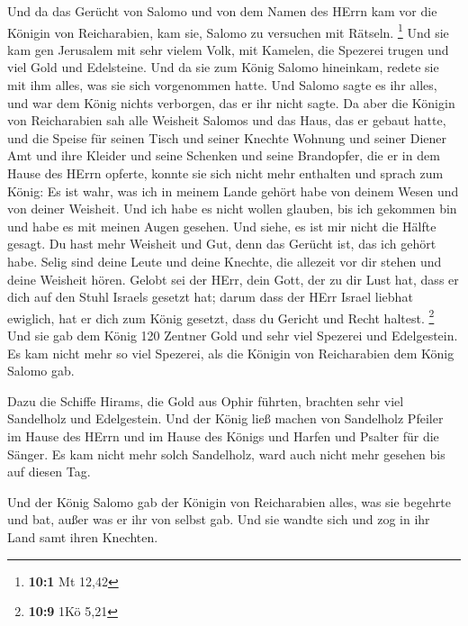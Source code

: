  Und da das Gerücht von Salomo und von dem Namen des HErrn
kam vor die Königin von Reicharabien, kam sie, Salomo zu versuchen mit
Rätseln. \footnote{\textbf{10:1} Mt 12,42}  Und sie kam gen
Jerusalem mit sehr vielem Volk, mit Kamelen, die Spezerei trugen und
viel Gold und Edelsteine. Und da sie zum König Salomo hineinkam, redete
sie mit ihm alles, was sie sich vorgenommen hatte.  Und
Salomo sagte es ihr alles, und war dem König nichts verborgen, das er
ihr nicht sagte.  Da aber die Königin von Reicharabien sah
alle Weisheit Salomos und das Haus, das er gebaut hatte, 
und die Speise für seinen Tisch und seiner Knechte Wohnung und seiner
Diener Amt und ihre Kleider und seine Schenken und seine Brandopfer, die
er in dem Hause des HErrn opferte, konnte sie sich nicht mehr enthalten
 und sprach zum König: Es ist wahr, was ich in meinem Lande
gehört habe von deinem Wesen und von deiner Weisheit.  Und
ich habe es nicht wollen glauben, bis ich gekommen bin und habe es mit
meinen Augen gesehen. Und siehe, es ist mir nicht die Hälfte gesagt. Du
hast mehr Weisheit und Gut, denn das Gerücht ist, das ich gehört habe.
 Selig sind deine Leute und deine Knechte, die allezeit vor
dir stehen und deine Weisheit hören.  Gelobt sei der HErr,
dein Gott, der zu dir Lust hat, dass er dich auf den Stuhl Israels
gesetzt hat; darum dass der HErr Israel liebhat ewiglich, hat er dich
zum König gesetzt, dass du Gericht und Recht haltest. \footnote{\textbf{10:9}
  1Kö 5,21}  Und sie gab dem König 120 Zentner Gold und
sehr viel Spezerei und Edelgestein. Es kam nicht mehr so viel Spezerei,
als die Königin von Reicharabien dem König Salomo gab.

 Dazu die Schiffe Hirams, die Gold aus Ophir führten,
brachten sehr viel Sandelholz und Edelgestein.  Und der
König ließ machen von Sandelholz Pfeiler im Hause des HErrn und im Hause
des Königs und Harfen und Psalter für die Sänger. Es kam nicht mehr
solch Sandelholz, ward auch nicht mehr gesehen bis auf diesen Tag.

 Und der König Salomo gab der Königin von Reicharabien
alles, was sie begehrte und bat, außer was er ihr von selbst gab. Und
sie wandte sich und zog in ihr Land samt ihren Knechten.

